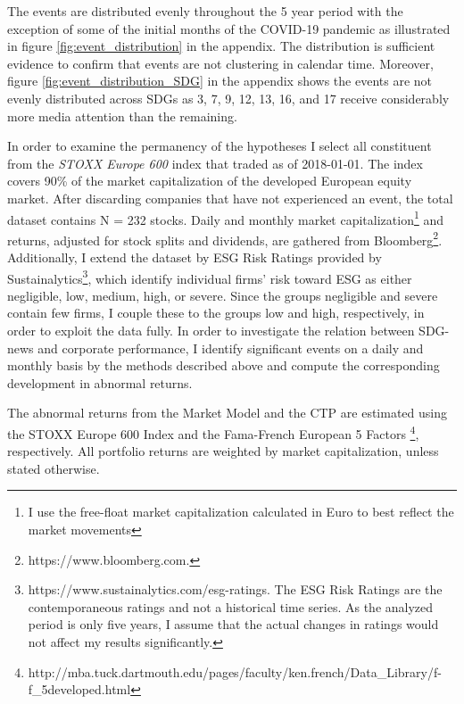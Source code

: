The events are distributed evenly throughout the 5 year period with the exception of some of the initial months of the COVID-19 pandemic as illustrated in figure \ref{fig:event_distribution} in the appendix. The distribution is sufficient evidence to confirm that events are not clustering in calendar time. Moreover, figure \ref{fig:event_distribution_SDG} in the appendix shows the events are not evenly distributed across SDGs as 3, 7, 9, 12, 13, 16, and 17 receive considerably more media attention than the remaining. 

In order to examine the permanency of the hypotheses I select all constituent from the \textit{STOXX Europe 600} index that traded as of 2018-01-01. The index covers 90\% of the market capitalization of the developed European equity market. After discarding companies that have not experienced an event, the total dataset contains N = 232 stocks. Daily and monthly market capitalization\footnote{I use the free-float market capitalization calculated in Euro to best reflect the market movements} and returns, adjusted for stock splits and dividends, are gathered from Bloomberg\footnote{https://www.bloomberg.com.}. Additionally, I extend the dataset by ESG Risk Ratings provided by Sustainalytics\footnote{https://www.sustainalytics.com/esg-ratings. The ESG Risk Ratings are the contemporaneous ratings and not a historical time series. As the analyzed period is only five years, I assume that the actual changes in ratings would not affect my results significantly.}, which identify individual firms' risk toward ESG as either negligible, low, medium, high, or severe. Since the groups negligible and severe contain few firms, I couple these to the groups low and high, respectively, in order to exploit the data fully.    
In order to investigate the relation between SDG-news and corporate performance, I identify significant events on a daily and monthly basis by the methods described above and compute the corresponding development in abnormal returns. 

The abnormal returns from the Market Model and the CTP are estimated using the STOXX Europe 600 Index and the Fama-French European 5 Factors \footnote{http://mba.tuck.dartmouth.edu/pages/faculty/ken.french/Data\_Library/f-f\_5developed.html}, respectively. All portfolio returns are weighted by market capitalization, unless stated otherwise. 

